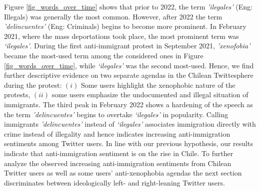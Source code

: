        Figure \ref{fig_words_over_time} shows that prior to 2022, the term {\it 'ilegales'} (Eng: Illegals) was generally the most common. However, after 2022 the term {\it 'delincuentes'} (Eng: Criminals) begins to become more prominent. In February 2021, where the mass deportations took place, the most prominent term was {\it ‘ilegales’}. %
       During the first anti-immigrant protest in September 2021, {\it 'xenofobia'} became the most-used term among the considered ones in Figure \ref{fig_words_over_time}, while {\it ‘ilegales’} was the second most-used. Hence, we find further descriptive evidence on two separate agendas in the Chilean Twittesphere during the protest: $(i)$ Some users highlight the xenophobic nature of the protests, $(ii)$ some users emphasize the undocumented and illegal situation of immigrants. The third peak in February 2022 shows a hardening of the speech as the term {\it 'delincuentes'} begins to overtake {\it ‘ilegales’} in popularity. Calling immigrants {\it 'delincuentes'} instead of {\it ‘ilegales’} associates immigration directly with crime instead of illegality and hence indicates increasing anti-immigration sentiments among Twitter users. In line with our previous hypothesis, our results indicate that anti-immigration sentiment is on the rise in Chile. 
       To further analyze the observed increasing anti-immigration sentiments from Chilean Twitter users as well as some users' anti-xenophobia agendas the next section discriminates between ideologically left- and right-leaning Twitter users. 
       
